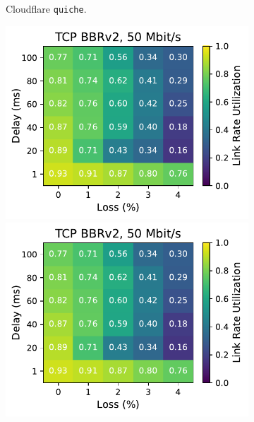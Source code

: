 \begin{figure}[ht]
\begin{subfigure}[b]{0.22\linewidth}
        \caption{Cloudflare \texttt{quiche}.}
    \end{subfigure}
    \begin{subfigure}[b]{1cm}
        \includegraphics[width=\linewidth,trim={8cm 0 0 0},clip]{figures/heatmaps/heatmap_tcp_bbr2_50mbps.pdf}
        \vspace*{0.22cm}
        \includegraphics[width=\linewidth,trim={8cm 0 0 0},clip]{figures/heatmaps/heatmap_tcp_bbr2_50mbps.pdf}
        \vspace*{0.22cm}

\end{subfigure}
\end{figure}
